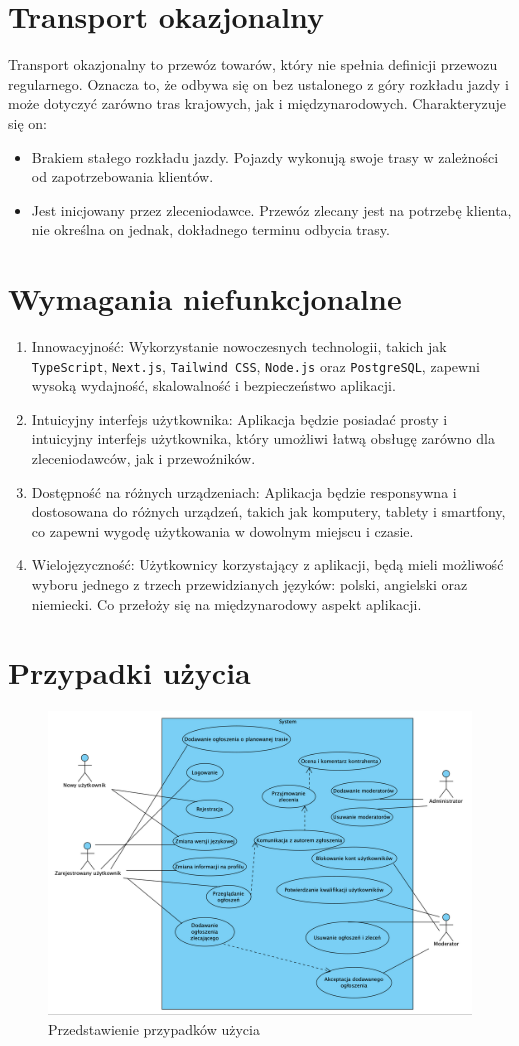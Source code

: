 \section{Transport okazjonalny}
Transport okazjonalny to przewóz towarów, który nie spełnia definicji przewozu regularnego. Oznacza to, że odbywa się on bez ustalonego z góry rozkładu jazdy i może dotyczyć zarówno tras krajowych, jak i międzynarodowych.
Charakteryzuje się on:
\begin{itemize}
\item Brakiem stałego rozkładu jazdy. Pojazdy wykonują swoje trasy w zależności od zapotrzebowania klientów.
\item Jest inicjowany przez zleceniodawce. Przewóz zlecany jest na potrzebę klienta, nie określna on jednak, dokładnego terminu odbycia trasy.
\end{itemize}

\section{Wymagania niefunkcjonalne}
\begin{enumerate}[labelwidth=\widthof{\ref{last-item}},label=\arabic*.]
\item Innowacyjność: Wykorzystanie nowoczesnych technologii, takich jak \texttt{TypeScript}, \texttt{Next.js}, \texttt{Tailwind CSS}, \texttt{Node.js} oraz \texttt{PostgreSQL}, zapewni wysoką wydajność, skalowalność i bezpieczeństwo aplikacji.
\item Intuicyjny interfejs użytkownika: Aplikacja będzie posiadać prosty i intuicyjny interfejs użytkownika, który umożliwi łatwą obsługę zarówno dla zleceniodawców, jak i przewoźników.
\item Dostępność na różnych urządzeniach: Aplikacja będzie responsywna i dostosowana do różnych urządzeń, takich jak komputery, tablety i smartfony, co zapewni wygodę użytkowania w dowolnym miejscu i czasie.
\item Wielojęzyczność: Użytkownicy korzystający z aplikacji, będą mieli możliwość wyboru jednego z trzech przewidzianych języków: polski, angielski oraz niemiecki. Co przełoży się na międzynarodowy aspekt aplikacji.
\end{enumerate}

\section{Przypadki użycia}
\begin{figure}[ht]
	\centering
		\includegraphics[width=0.9\linewidth]{rozdzial1/use_case.png}
	\caption{Przedstawienie przypadków użycia}
	\label{fig:Przedstawienie przypadków użycia}
\end{figure}
